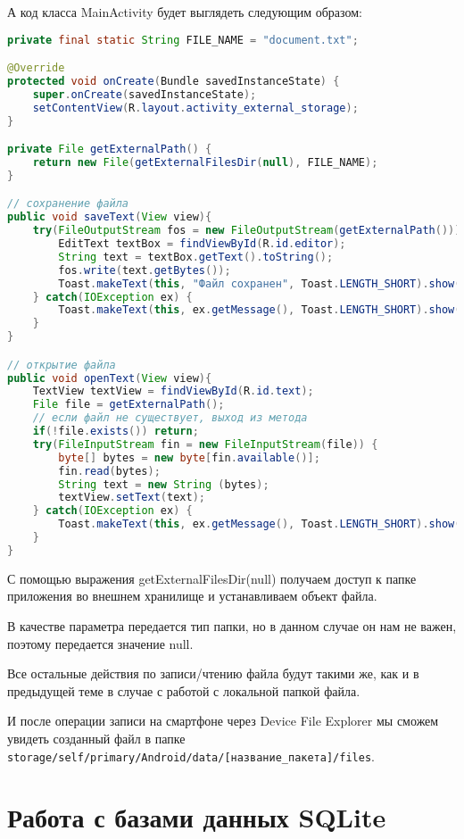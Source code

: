 А код класса MainActivity будет выглядеть следующим образом:

\begin{lstlisting}[language=Java
	, label=lst:
	]
private final static String FILE_NAME = "document.txt";

@Override
protected void onCreate(Bundle savedInstanceState) {
	super.onCreate(savedInstanceState);
	setContentView(R.layout.activity_external_storage);
}

private File getExternalPath() {
	return new File(getExternalFilesDir(null), FILE_NAME);
}

// сохранение файла
public void saveText(View view){
	try(FileOutputStream fos = new FileOutputStream(getExternalPath())) {
		EditText textBox = findViewById(R.id.editor);
		String text = textBox.getText().toString();
		fos.write(text.getBytes());
		Toast.makeText(this, "Файл сохранен", Toast.LENGTH_SHORT).show();
	} catch(IOException ex) {
		Toast.makeText(this, ex.getMessage(), Toast.LENGTH_SHORT).show();
	}
}

// открытие файла
public void openText(View view){
	TextView textView = findViewById(R.id.text);
	File file = getExternalPath();
	// если файл не существует, выход из метода
	if(!file.exists()) return;
	try(FileInputStream fin = new FileInputStream(file)) {
		byte[] bytes = new byte[fin.available()];
		fin.read(bytes);
		String text = new String (bytes);
		textView.setText(text);
	} catch(IOException ex) {
		Toast.makeText(this, ex.getMessage(), Toast.LENGTH_SHORT).show();
	}
}
\end{lstlisting}

С помощью выражения getExternalFilesDir(null) получаем доступ к папке
приложения во внешнем хранилище и устанавливаем объект файла.\par
В качестве параметра передается тип папки, но в данном случае он нам не
важен, поэтому передается значение null.\par
Все остальные действия по записи/чтению файла будут такими же, как и в
предыдущей теме в случае с работой с локальной папкой файла.\par
И после операции записи на смартфоне через Device File Explorer мы сможем
увидеть созданный файл в папке
\verb|storage/self/primary/Android/data/[название_пакета]/files|.\par

\section{Работа с базами данных SQLite}
